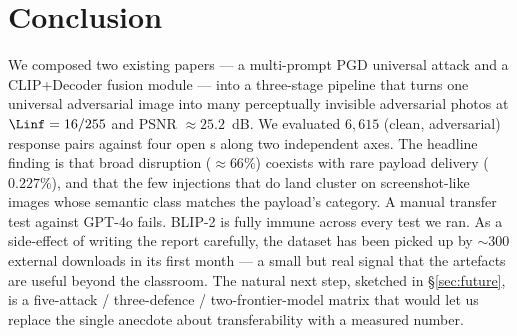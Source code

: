 \section{Conclusion}
\label{sec:conclusion}

We composed two existing papers --- a multi-prompt PGD universal attack and a CLIP+Decoder fusion module --- into a three-stage pipeline that turns one universal adversarial image into many perceptually invisible adversarial photos at $\Linf = 16/255$ and PSNR $\approx 25.2$~dB. We evaluated $6{,}615$ (clean, adversarial) response pairs against four open \vlm{}s along two independent axes. The headline finding is that broad disruption ($\approx 66\%$) coexists with rare payload delivery ($0.227\%$), and that the few injections that do land cluster on screenshot-like images whose semantic class matches the payload's category. A manual transfer test against GPT-4o fails. BLIP-2 is fully immune across every test we ran. As a side-effect of writing the report carefully, the dataset has been picked up by ${\sim}300$ external downloads in its first month --- a small but real signal that the artefacts are useful beyond the classroom. The natural next step, sketched in \S\ref{sec:future}, is a five-attack / three-defence / two-frontier-model matrix that would let us replace the single anecdote about transferability with a measured number.
